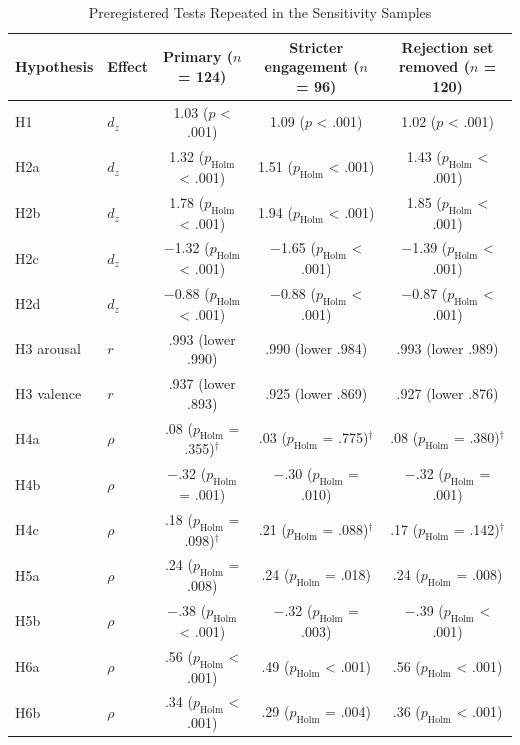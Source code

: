 \begin{table}[tbp]
\caption{Preregistered Tests Repeated in the Sensitivity Samples}
\label{tab:sensitivity}
\begin{threeparttable}
\footnotesize\linespread{1}\selectfont\setlength{\tabcolsep}{3.5pt}
\begin{tabular}{@{}llccc@{}}
\toprule
Hypothesis & Effect & Primary ($n$ = 124) & Stricter engagement ($n$ = 96) & Rejection set removed ($n$ = 120) \\
\midrule
H1 & $d_z$ & 1.03 ($p$ < .001) & 1.09 ($p$ < .001) & 1.02 ($p$ < .001) \\
H2a & $d_z$ & 1.32 ($p_\mathrm{Holm}$ < .001) & 1.51 ($p_\mathrm{Holm}$ < .001) & 1.43 ($p_\mathrm{Holm}$ < .001) \\
H2b & $d_z$ & 1.78 ($p_\mathrm{Holm}$ < .001) & 1.94 ($p_\mathrm{Holm}$ < .001) & 1.85 ($p_\mathrm{Holm}$ < .001) \\
H2c & $d_z$ & $-$1.32 ($p_\mathrm{Holm}$ < .001) & $-$1.65 ($p_\mathrm{Holm}$ < .001) & $-$1.39 ($p_\mathrm{Holm}$ < .001) \\
H2d & $d_z$ & $-$0.88 ($p_\mathrm{Holm}$ < .001) & $-$0.88 ($p_\mathrm{Holm}$ < .001) & $-$0.87 ($p_\mathrm{Holm}$ < .001) \\
H3 arousal & $r$ & .993 (lower .990) & .990 (lower .984) & .993 (lower .989) \\
H3 valence & $r$ & .937 (lower .893) & .925 (lower .869) & .927 (lower .876) \\
H4a & $\rho$ & .08 ($p_\mathrm{Holm}$ = .355)$^\dagger$ & .03 ($p_\mathrm{Holm}$ = .775)$^\dagger$ & .08 ($p_\mathrm{Holm}$ = .380)$^\dagger$ \\
H4b & $\rho$ & $-$.32 ($p_\mathrm{Holm}$ = .001) & $-$.30 ($p_\mathrm{Holm}$ = .010) & $-$.32 ($p_\mathrm{Holm}$ = .001) \\
H4c & $\rho$ & .18 ($p_\mathrm{Holm}$ = .098)$^\dagger$ & .21 ($p_\mathrm{Holm}$ = .088)$^\dagger$ & .17 ($p_\mathrm{Holm}$ = .142)$^\dagger$ \\
H5a & $\rho$ & .24 ($p_\mathrm{Holm}$ = .008) & .24 ($p_\mathrm{Holm}$ = .018) & .24 ($p_\mathrm{Holm}$ = .008) \\
H5b & $\rho$ & $-$.38 ($p_\mathrm{Holm}$ < .001) & $-$.32 ($p_\mathrm{Holm}$ = .003) & $-$.39 ($p_\mathrm{Holm}$ < .001) \\
H6a & $\rho$ & .56 ($p_\mathrm{Holm}$ < .001) & .49 ($p_\mathrm{Holm}$ < .001) & .56 ($p_\mathrm{Holm}$ < .001) \\
H6b & $\rho$ & .34 ($p_\mathrm{Holm}$ < .001) & .29 ($p_\mathrm{Holm}$ = .004) & .36 ($p_\mathrm{Holm}$ < .001) \\

\end{tabular}
\end{threeparttable}
\end{table}

